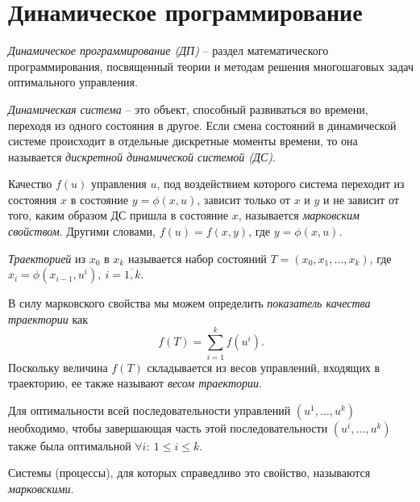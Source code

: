 \section{Динамическое программирование}

\begin{definition}
  \emph{Динамическое программирование (ДП)} -- раздел математического программирования, посвященный теории и методам решения многошаговых задач оптимального управления.
\end{definition}

\begin{definition}
  \emph{Динамическая система} -- это объект, способный развиваться во времени, переходя из одного состояния в другое. Если смена состояний в динамической системе происходит в отдельные дискретные моменты времени, то она называется \emph{дискретной динамической системой (ДС)}.
\end{definition}

\begin{definition}
  Качество $f(u)$ управления $u$, под воздействием которого система переходит из состояния $x$ в состояние $y = \phi (x,u)$, зависит только от $x$ и $y$ и не зависит от того, каким образом ДС пришла в состояние $x$, называется \emph{марковским свойством}. Другими словами, $f(u) = f(x,y)$, где $y = \phi (x,u)$.
\end{definition}

\begin{definition}[Траектория из $x_0$ в $x_k$]
  \emph{Траекторией} из $x_0$ в $x_k$ называется набор состояний $T = (x_0,x_1,\ldots ,x_k)$, где $x_i = \phi (x_{i-1} ,u^i), \ i = \overline{1,k} $.
\end{definition}

\begin{definition}
  В силу марковского свойства мы можем определить \emph{показатель качества траектории} как
  \[
    f(T) = \sum_{i=1}^{k} f(u^i).
  \]
  Поскольку величина $f(T)$ складывается из весов управлений, входящих в траекторию, ее также называют \emph{весом траектории}.
\end{definition}

\begin{definition}
  Для оптимальности всей последовательности управлений $(u^1,\ldots ,u^k)$ необходимо, чтобы завершающая часть этой последовательности $(u^i,\ldots ,u^k)$ также была оптимальной $\forall i: \ 1 \leqslant i \leqslant k$.

  Системы (процессы), для которых справедливо это свойство, называются \emph{марковскими}.
\end{definition}

